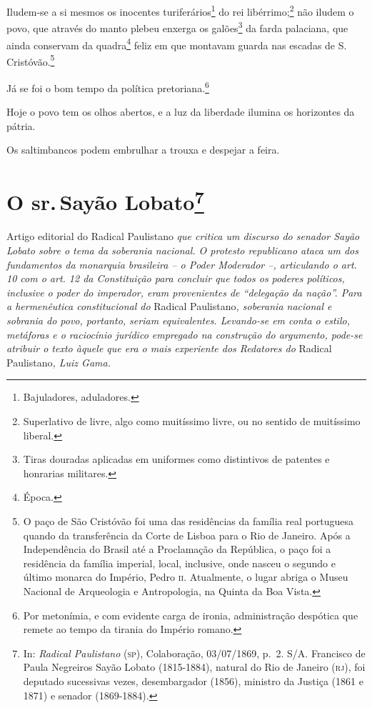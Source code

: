 Iludem-se a si mesmos os inocentes turiferários\footnote{Bajuladores,
  aduladores.} do rei libérrimo;\footnote{Superlativo de livre, algo
  como muitíssimo livre, ou no sentido de muitíssimo liberal.} não
iludem o povo, que através do manto plebeu enxerga os galões\footnote{
  Tiras douradas aplicadas em uniformes como distintivos de patentes e
  honrarias militares.} da farda palaciana, que ainda conservam da
quadra\footnote{Época.} feliz em que montavam guarda nas escadas de S.
Cristóvão.\footnote{O paço de São Cristóvão foi uma das residências da
  família real portuguesa quando da transferência da Corte de Lisboa
  para o Rio de Janeiro. Após a Independência do Brasil até a
  Proclamação da República, o paço foi a residência da família imperial,
  local, inclusive, onde nasceu o segundo e último monarca do Império,
  Pedro \textsc{ii}. Atualmente, o lugar abriga o Museu Nacional de Arqueologia e
  Antropologia, na Quinta da Boa Vista.}

Já se foi o bom tempo da política pretoriana.\footnote{Por metonímia, e
  com evidente carga de ironia, administração despótica que remete ao
  tempo da tirania do Império romano.}

Hoje o povo tem os olhos abertos, e a luz da liberdade ilumina os
horizontes da pátria.

Os saltimbancos podem embrulhar a trouxa e despejar a feira.

\chapter{O sr.\,Sayão Lobato\footnote{In: \emph{Radical Paulistano} (\textsc{sp}),
  Colaboração, 03/07/1869, p.~2. S/A. Francisco de Paula Negreiros Sayão
  Lobato (1815-1884), natural do Rio de Janeiro (\textsc{rj}), foi deputado
  sucessivas vezes, desembargador (1856), ministro da Justiça (1861 e
  1871) e senador (1869-1884).}}

\begin{didascalia}
Artigo editorial do Radical Paulistano \emph{que critica um discurso do
senador Sayão Lobato sobre o tema da soberania nacional. O protesto
republicano ataca um dos fundamentos da monarquia brasileira -- o Poder
Moderador --, articulando o art. 10 com o art. 12 da Constituição para
concluir que todos os poderes políticos, inclusive o poder do imperador,
eram provenientes de ``delegação da nação''. Para a hermenêutica
constitucional do} Radical Paulistano\emph{, soberania nacional e
sobrania do povo, portanto, seriam equivalentes. Levando-se em conta o
estilo, metáforas e o raciocínio jurídico empregado na construção do
argumento, pode-se atribuir o texto àquele que era o mais experiente dos
Redatores do} Radical Paulistano\emph{, Luiz Gama.}
\end{didascalia}



